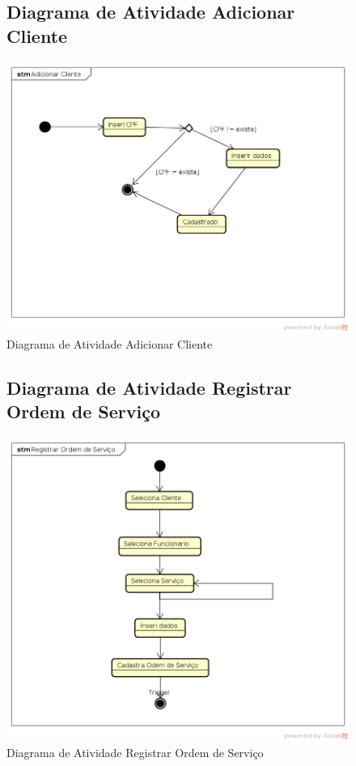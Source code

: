 \documentclass[
	12pt,				%
	openright,
	oneside,			%
	a4paper,			%
	chapter=TITLE,		%
	brazil				%
	]{abntex2}
\begin{document}
\begin{figure}[h!]
\subsection{Diagrama de Atividade Adicionar Cliente}
	\caption{Diagrama de Atividade Adicionar Cliente}
	\begin{center}
	    \includegraphics[scale=0.6]{Arquivos/DTE/Adicionar_Cliente}  
	\end{center}
\end{figure}


\begin{figure}[h!]
\subsection{Diagrama de Atividade Registrar Ordem de Serviço}
	\caption{Diagrama de Atividade Registrar Ordem de Serviço}
	\begin{center}
	    \includegraphics[scale=0.6]{Arquivos/DTE/Registrar_Ordem_de_Servico}  
	\end{center}
\end{figure}
\end{document}
